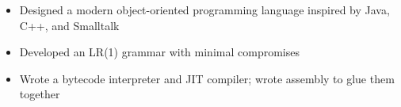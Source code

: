 \begin{itemize}
  \item Designed a modern object-oriented programming language inspired by Java, C++, and Smalltalk
  \item Developed an LR(1) grammar with minimal compromises
  \item Wrote a bytecode interpreter and JIT compiler; wrote assembly to glue them together
\end{itemize}
\vspace{4pt}
